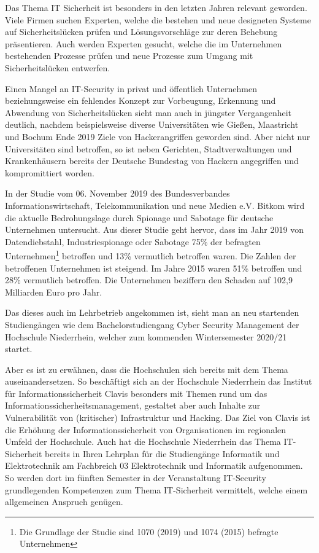 Das Thema IT Sicherheit ist besonders in den letzten Jahren relevant geworden. Viele Firmen suchen Experten\cite{it-daily.netITSecurityExpertenWerdenHanderingend2019}, welche die bestehen und neue designeten Systeme auf Sicherheitslücken prüfen und Lösungsvorschläge zur deren Behebung präsentieren. Auch werden Experten gesucht, welche die im Unternehmen bestehenden Prozesse prüfen und neue Prozesse zum Umgang mit Sicherheitslücken entwerfen.

Einen Mangel an IT-Security in privat und öffentlich Unternehmen beziehungsweise ein fehlendes Konzept zur Vorbeugung, Erkennung und Abwendung von Sicherheitslücken sieht man auch in jüngster Vergangenheit deutlich, nachdem beispielsweise diverse Universitäten wie Gießen, Maastricht und Bochum Ende 2019 Ziele von Hackerangriffen geworden sind. Aber nicht nur Universitäten sind betroffen, so ist neben Gerichten, Stadtverwaltungen und Krankenhäusern bereits der Deutsche Bundestag von Hackern angegriffen und kompromittiert worden.

In der Studie  vom 06. November 2019 des Bundesverbandes Informationswirtschaft, Telekommunikation und neue Medien e.V. Bitkom wird die aktuelle Bedrohungslage durch Spionage und Sabotage für deutsche Unternehmen untersucht. Aus dieser Studie geht hervor, dass im Jahr 2019 von Datendiebstahl, Industriespionage oder Sabotage 75\% der befragten Unternehmen\footnote{Die Grundlage der Studie sind 1070 (2019) und 1074 (2015) befragte Unternehmen} betroffen  und 13\% vermutlich betroffen waren. Die Zahlen der betroffenen Unternehmen ist steigend. Im Jahre 2015 waren  51\% betroffen und 28\% vermutlich betroffen. Die Unternehmen beziffern den Schaden auf 102,9 Milliarden Euro pro Jahr.\cite{bergWirtschaftsschutzDigitalenWelt2019}

Das dieses auch im Lehrbetrieb angekommen ist, sieht man an neu startenden Studiengängen wie dem Bachelorstudiengang Cyber Security Management der Hochschule Niederrhein, welcher zum kommenden Wintersemester 2020/21 startet.\cite{hochschuleniederrheinHackernRoteKarte2020}

Aber es ist zu erwähnen, dass die Hochschulen sich bereits mit dem Thema auseinandersetzen. 
So beschäftigt sich an der Hochschule Niederrhein das Institut für Informationssicherheit Clavis besonders mit Themen rund um das Informationssicherheitsmanagement, gestaltet aber auch Inhalte zur Vulnerabilität von (kritischer) Infrastruktur und Hacking.
Das Ziel von Clavis ist die Erhöhung der Informationssicherheit von Organisationen im regionalen Umfeld der Hochschule.
\cite{hochschuleniederrheinFlyerInstitutClavis}
Auch hat die Hochschule Niederrhein das Thema IT-Sicherheit bereits in Ihren Lehrplan für die Studiengänge Informatik und Elektrotechnik am Fachbreich 03 Elektrotechnik und Informatik aufgenommen. So werden dort im fünften Semester in der Veranstaltung IT-Security grundlegenden Kompetenzen zum Thema IT-Sicherheit vermittelt, welche einem allgemeinen Anspruch genügen.\cite{hochschuleniederrheinModulhandbuchVollzeitBA2019}